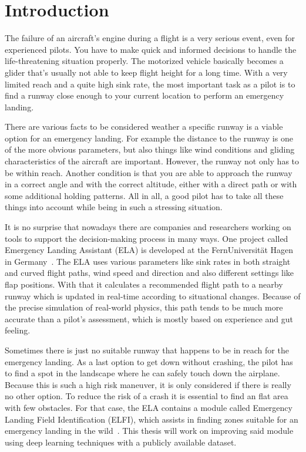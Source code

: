 \section{Introduction}
The failure of an aircraft's engine during a flight is a very serious event, even for experienced pilots. You have to make quick and informed decisions to handle the life-threatening situation properly. The motorized vehicle basically becomes a glider that's usually not able to keep flight height for a long time. With a very limited reach and a quite high sink rate, the most important task as a pilot is to find a runway close enough to your current location to perform an emergency landing.

There are various facts to be considered weather a specific runway is a viable option for an emergency landing. For example the distance to the runway is one of the more obvious parameters, but also things like wind conditions and gliding characteristics of the aircraft are important. However, the runway not only has to be within reach. Another condition is that you are able to approach the runway in a correct angle and with the correct altitude, either with a direct path or with some additional holding patterns. All in all, a good pilot has to take all these things into account while being in such a stressing situation.

It is no surprise that nowadays there are companies and researchers working on tools to support the decision-making process in many ways. One project called Emergency Landing Assistant (ELA) is developed at the FernUniversität Hagen in Germany~\cite{feu_fas}. The ELA uses various parameters like sink rates in both straight and curved flight paths, wind speed and direction and also different settings like flap positions. With that it calculates a recommended flight path to a nearby runway which is updated in real-time according to situational changes. Because of the precise simulation of real-world physics, this path tends to be much more accurate than a pilot's assessment, which is mostly based on experience and gut feeling.

Sometimes there is just no suitable runway that happens to be in reach for the emergency landing. As a last option to get down without crashing, the pilot has to find a spot in the landscape where he can safely touch down the airplane. Because this is such a high risk maneuver, it is only considered if there is really no other option. To reduce the risk of a crash it is essential to find an flat area with few obstacles. For that case, the ELA contains a module called Emergency Landing Field Identification (ELFI), which assists in finding zones suitable for an emergency landing in the wild~\cite{feu_elfi}. This thesis will work on improving said module using deep learning techniques with a publicly available dataset.

